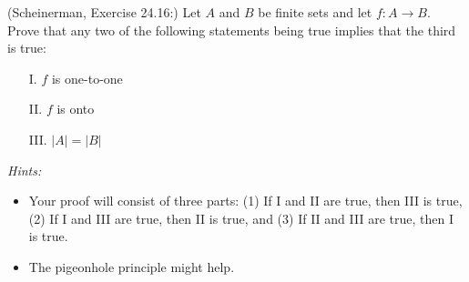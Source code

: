 \documentclass{article}
\theoremstyle{definition}
\begin{document}
\begin{question}
    (Scheinerman, Exercise 24.16:) 
    Let $A$ and $B$ be finite sets and let $f: A \rightarrow B$.  Prove that any two of the following statements being true implies that the third is true:
	\begin{itemize}
	\item[I.] $f$ is one-to-one
	\item[II.] $f$ is onto
	\item[III.] $|A| = |B|$
	\end{itemize}

	{\it Hints:}
	\begin{itemize}
	\item Your proof will consist of three parts: (1) If I and II are true, then III is true, (2) If I and III are true, then II is true, and (3) If II and III are true, then I is true.
	\item The pigeonhole principle might help.
	\end{itemize}
\end{question}
\end{document}
